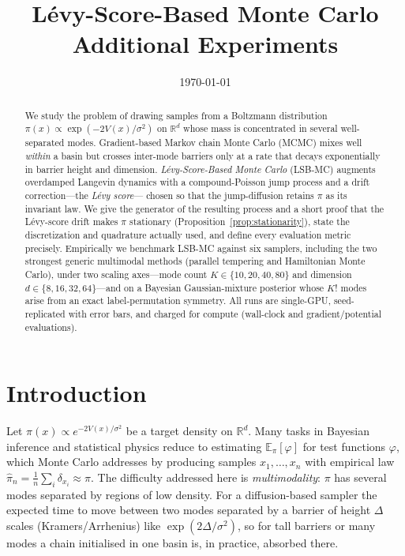 \documentclass[11pt]{article}
\title{\textbf{L\'evy-Score-Based Monte Carlo Additional Experiments}}
\date{\today}
\theoremstyle{plain}
\theoremstyle{remark}
\newcommand{\R}{\mathbb{R}}
\newcommand{\E}{\mathbb{E}}
\begin{document}
\maketitle

\begin{abstract}
We study the problem of drawing samples from a Boltzmann distribution
$\pi(x)\propto\exp(-2V(x)/\sigma^2)$ on $\R^d$ whose mass is concentrated in
several well-separated modes. Gradient-based Markov chain Monte Carlo (MCMC)
mixes well \emph{within} a basin but crosses inter-mode barriers only at a rate
that decays exponentially in barrier height and dimension. \emph{L\'evy-Score-Based
Monte Carlo} (LSB-MC) augments overdamped Langevin dynamics with a
compound-Poisson jump process and a drift correction---the \emph{L\'evy score}---
chosen so that the jump-diffusion retains $\pi$ as its invariant law. We give the
generator of the resulting process and a short proof that the L\'evy-score drift
makes $\pi$ stationary (Proposition~\ref{prop:stationarity}), state the
discretization and quadrature actually used, and define every evaluation metric
precisely. Empirically we benchmark LSB-MC against six samplers, including the two
strongest generic multimodal methods (parallel tempering and Hamiltonian Monte
Carlo), under two scaling axes---mode count $K\in\{10,20,40,80\}$ and dimension
$d\in\{8,16,32,64\}$---and on a Bayesian Gaussian-mixture posterior whose
$K!$ modes arise from an exact label-permutation symmetry. All runs are
single-GPU, seed-replicated with error bars, and charged for compute (wall-clock
and gradient/potential evaluations).
\end{abstract}

\section{Introduction}\label{sec:intro}
Let $\pi(x)\propto e^{-2V(x)/\sigma^2}$ be a target density on $\R^d$. Many tasks
in Bayesian inference and statistical physics reduce to estimating
$\E_\pi[\varphi]$ for test functions $\varphi$, which Monte Carlo addresses by
producing samples $x_1,\dots,x_n$ with empirical law $\hat\pi_n=\frac1n\sum_i
\delta_{x_i}\approx\pi$. The difficulty addressed here is \emph{multimodality}:
$\pi$ has several modes separated by regions of low density. For a diffusion-based
sampler the expected time to move between two modes separated by a barrier of
height $\Delta$ scales (Kramers/Arrhenius) like $\exp(2\Delta/\sigma^2)$, so for
tall barriers or many modes a chain initialised in one basin is, in practice,
absorbed there.
\end{document}
